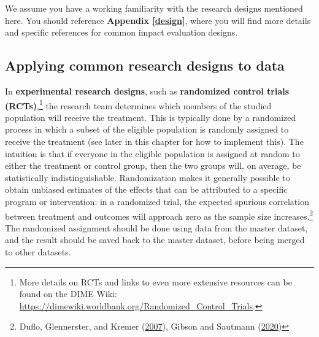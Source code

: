 \documentclass[
]{book}
\begin{document}
We assume you have a working familiarity
with the research designs mentioned here.
You should reference \textbf{Appendix \ref{design}},
where you will find more details
and specific references for common impact evaluation designs.

\hypertarget{applying-common-research-designs-to-data}{%
\subsection*{Applying common research designs to data}\label{applying-common-research-designs-to-data}}

In \textbf{experimental research designs},
such as \textbf{randomized control trials (RCTs)},\footnote{More details on RCTs and links to even more extensive resources
  can be found on the DIME Wiki:
  \url{https://dimewiki.worldbank.org/Randomized_Control_Trials}.}
the research team determines which members
of the studied population will receive the treatment.
This is typically done by a randomized process
in which a subset of the eligible population
is randomly assigned to receive the treatment
(see later in this chapter for how to implement this).
The intuition is that if everyone in the eligible population
is assigned at random to either the treatment or control group,
then the two groups will, on average, be statistically indistinguishable.
Randomization makes it generally possible to obtain unbiased estimates of
the effects that can be attributed to a specific program or intervention:
in a randomized trial, the expected spurious correlation between treatment and outcomes
will approach zero as the sample size increases.\footnote{Duflo, Glennerster, and Kremer (\protect\hyperlink{ref-duflo2007using}{2007}), Gibson and Sautmann (\protect\hyperlink{ref-JPAL2020rct}{2020})}
The randomized assignment should be done
using data from the master dataset,
and the result should be saved back to the master dataset,
before being merged to other datasets.
\end{document}
